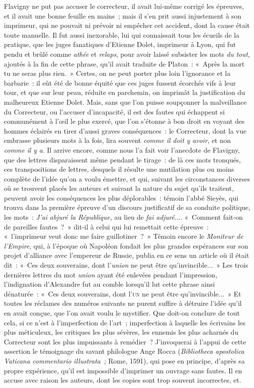 \documentclass[french,twoside]{book} %
\begin{document}
Flavigny ne put pas accuser le correcteur, il avait lui-même corrigé les épreuves, et il  avait une bonne feuille en mains ; mais il s’en prit aussi injustement à son imprimeur, qui ne pouvait ni prévoir ni empêcher cet accident, dont la cause était toute manuelle. Il fut aussi inexorable, lui qui connaissait tous les écueils de la pratique, que les juges fanatiques d’Etienne Dolet, imprimeur à Lyon, qui fut pendu et brûlé comme \emph{athée } et \emph{relaps}, pour avoir laissé subsister les mots \emph{du tout}, ajoutés à la fin de cette phrase, qu’il avait traduite de Platon : « Après la mort tu ne seras plus rien. » Certes, on ne peut porter plus loin l’ignorance et la barbarie : il eût été de bonne équité que ces juges fussent écorchés vifs à leur tour, et que sur leur peau, réduite en parchemin, on imprimât la justification du malheureux Etienne Dolet. Mais, sans que l’on puisse soupçonner la malveillance du Correcteur, ou l’accuser d’incapacité, il est des fautes qui échappent si communément à l’œil le  plus exercé, que l’on s’étonne à bon droit en voyant des hommes éclairés en tirer d’aussi graves conséquences : le Correcteur, dont la vue embrasse plusieurs mots à la fois, lira souvent \emph{comme il doit y avoir}, et non \emph{comme il y a.} Il arrive encore, comme nous l’a fait voir l’anecdote de Flavigny, que des lettres disparaissent même pendant le tirage : de là ces mots tronqués, ces transpositions de lettres, desquels il résulte une mutilation plus ou moins complète de l’idée qu’on a voulu émettre, et qui, suivant les circonstances diverses où se trouvent placés les auteurs et suivant la nature du sujet qu’ils traitent, peuvent avoir les conséquences les plus déplorables : témoin l’abbé Sieyès, qui trouva dans la première épreuve d’un discours justificatif de sa conduite politique, les mots : \emph{J’ai abjuré la République, } au lieu de \emph{fai adjuré}.... « Comment fait-on de pareilles fautes ? » dit-il à celui qui lui remettait  cette épreuve : « l’imprimeur veut donc me faire guillotiner ? » Témoin encore le \emph{Moniteur de l’Empire}, qui, à l’époque où Napoléon fondait les plus grandes espérances sur son projet d’alliance avec l’empereur de Russie, publia en ce sens un article où il était dit : « Ces deux souverains, dont l’\emph{union} ne peut être qu’invincible... » Les trois dernières lettres du mot \emph{union} ayant été enlevées pendant l’impression, l’indignation d’Alexandre fut au comble lorsqu’il lut cette phrase ainsi dénaturée : « Ces deux souverains, dont l’{\scshape un} ne peut être qu’invincible... » Et toutes les réclames des numéros suivants ne purent suffire à détruire l’idée qu’il en avait conçue, que l’on avait voulu le mystifier. Que doit-on conclure de tout cela, si ce n’est à l’imperfection de l’art ; imperfection à laquelle les écrivains les plus méticuleux, les critiques les plus sévères, les ennemis les plus acharnés du Correcteur  sont les plus impuissants à remédier ? J’invoquerai à l’appui de cette assertion le témoignage du savant philologue Ange Rocca (\emph{Bibliotheca apostolica Vaticana commentario illustrata ; } Rome, 1591), qui pose en principe, d’après sa propre expérience, qu’il est impossible d’imprimer un ouvrage sans fautes. Il en accuse avec raison les auteurs, dont les copies sont trop souvent incorrectes, et. 
\end{document}
